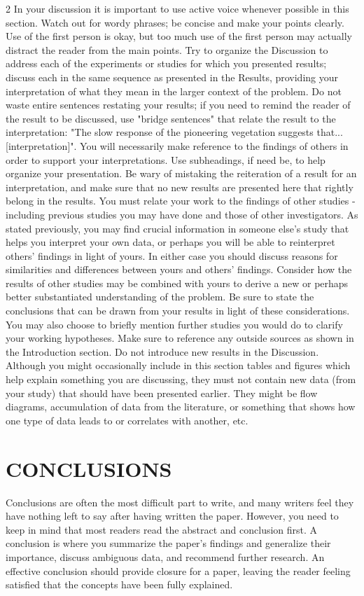 \documentclass[a4paper,10pt]{article}
\begin{document}
\begin{multicols}{2}
In your discussion it is important to use active voice whenever possible in this section. Watch out for wordy phrases; be concise and make your points clearly. Use of the first person is okay, but too much use of the first person may actually distract the reader from the main points.
Try to organize the Discussion to address each of the experiments or studies for which you presented results; discuss each in the same sequence as presented in the Results, providing your interpretation of what they mean in the larger context of the problem. Do not waste entire sentences restating your results; if you need to remind the reader of the result to be discussed, use "bridge sentences" that relate the result to the interpretation:
"The slow response of the pioneering vegetation suggests that...[interpretation]".
You will necessarily make reference to the findings of others in order to support your interpretations. Use subheadings, if need be, to help organize your presentation. Be wary of mistaking the reiteration of a result for an interpretation, and make sure that no new results are presented here that rightly belong in the results.
You must relate your work to the findings of other studies - including previous studies you may have done and those of other investigators. As stated previously, you may find crucial information in someone else's study that helps you interpret your own data, or perhaps you will be able to reinterpret others' findings in light of yours. In either case you should discuss reasons for similarities and differences between yours and others' findings. Consider how the results of other studies may be combined with yours to derive a new or perhaps better substantiated understanding of the problem. Be sure to state the conclusions that can be drawn from your results in light of these considerations. You may also choose to briefly mention further studies you would do to clarify your working hypotheses. Make sure to reference any outside sources as shown in the Introduction section.
Do not introduce new results in the Discussion. Although you might occasionally include in this section tables and figures which help explain something you are discussing, they must not contain new data (from your study) that should have been presented earlier. They might be flow diagrams, accumulation of data from the literature, or something that shows how one type of data leads to or correlates with another, etc.

\section*{CONCLUSIONS}
Conclusions are often the most difficult part to write, and many writers feel they have nothing left to say after having written the paper. However, you need to keep in mind that most readers read the abstract and conclusion first. A conclusion is where you summarize the paper’s findings and generalize their importance, discuss ambiguous data, and recommend further research. An effective conclusion should provide closure for a paper, leaving the reader feeling satisfied that the concepts have been fully explained. 


\end{multicols}
\end{document}
